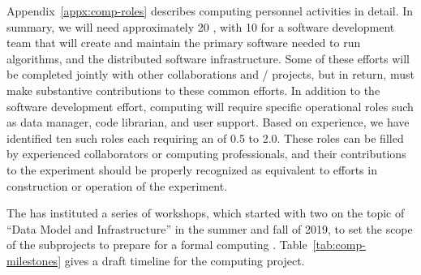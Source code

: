 Appendix~\ref{appx:comp-roles} describes computing personnel activities in detail.  In summary, we will need approximately 20 , with 10  for a software development team that will create and maintain the primary software needed to run  algorithms, and the distributed software infrastructure.  Some of these efforts will be completed jointly with other collaborations and / projects, but in return,  must make substantive contributions to these common efforts. In addition to the software development effort,   computing will require 
specific operational roles such as data manager, code librarian, and user support. %
Based on  experience, we have identified ten such roles 
each requiring an   of 0.5 to 2.0.  These roles can be filled by experienced  collaborators or computing professionals, and their contributions to the experiment should be properly recognized as equivalent to efforts in construction or operation of the experiment. 

The  has instituted a series of workshops, which started with two on the topic of  ``Data Model and Infrastructure'' in the summer and fall of 2019, to set the scope of the subprojects to prepare for a formal computing . Table~\ref{tab:comp-milestones} gives a draft timeline for the computing project.


